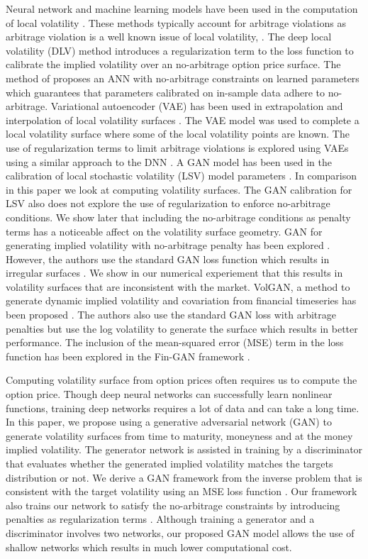 \documentclass{article}
\theoremstyle{plain}%
\theoremstyle{definition}
\theoremstyle{remark}
\begin{document}
Neural network and machine learning models have been used in the computation of local volatility \citep{itkin-2019, chataigner-2021}. These methods typically account for arbitrage violations as arbitrage violation is a well known issue of local volatility, \citep{gatheral-2001-1}. The deep local volatility (DLV) method introduces a regularization term to the loss function to calibrate the implied volatility over an no-arbitrage option price surface. The method of \citep{itkin-2019} proposes an ANN with no-arbitrage constraints on learned parameters which guarantees that parameters calibrated on in-sample data adhere to no-arbitrage. Variational autoencoder (VAE) has been used in extrapolation and interpolation of local volatility surfaces \citep{bergeron-2022}. The VAE model was used to complete a local volatility surface where some of the local volatility points are known. The use of regularization terms to limit arbitrage violations is explored using VAEs using a similar approach to the DNN \citep{bergeron-2022}. A GAN model has been used in the calibration of local stochastic volatility (LSV) model parameters \citep{cuchiero-2020}. In comparison in this paper we look at computing volatility surfaces. The GAN calibration for LSV \citep{cuchiero-2020} also does not explore the use of regularization to enforce no-arbitrage conditions. We show later that including the no-arbitrage conditions as penalty terms has a noticeable affect on the volatility surface geometry. GAN for generating implied volatility with no-arbitrage penalty has been explored \citep{sidogi-2022}. However, the authors use the standard GAN loss function which results in irregular surfaces \citep{cont-2022}. We show in our numerical experiement that this results in volatility surfaces that are inconsistent with the market. VolGAN, a method to generate dynamic implied volatility and covariation from financial timeseries has been proposed \citep{cont-2022}. The authors also use the standard GAN loss with arbitrage penalties but use the log volatility to generate the surface which results in better performance. The inclusion of the mean-squared error (MSE) term in the loss function has been explored in the Fin-GAN framework \citep{vuletic-2023}.

Computing volatility surface from option prices often requires us to compute the option price. Though deep neural networks can successfully learn nonlinear functions, training deep networks requires a lot of data and can take a long time. In this paper, we propose using a generative adversarial network (GAN) to generate volatility surfaces from time to maturity, moneyness and at the money implied volatility. The generator network is assisted in training by a discriminator that evaluates whether the generated implied volatility matches the targets distribution or not. We derive a GAN framework from the inverse problem that is consistent with the target volatility using an MSE loss function \citep{vuletic-2023}. Our framework also trains our network to satisfy the no-arbitrage constraints by introducing penalties as regularization terms \citep{roper-2010, itkin-2019}. Although training a generator and a discriminator involves two networks, our proposed GAN model allows the use of shallow networks which results in much lower computational cost.
\end{document}
